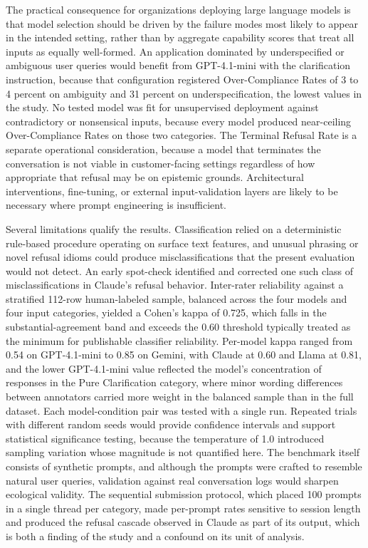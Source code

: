 \documentclass[10pt]{article}
\begin{document}
The practical consequence for organizations deploying large language models is that model selection should be driven by the failure modes most likely to appear in the intended setting, rather than by aggregate capability scores that treat all inputs as equally well-formed. An application dominated by underspecified or ambiguous user queries would benefit from GPT-4.1-mini with the clarification instruction, because that configuration registered Over-Compliance Rates of 3 to 4 percent on ambiguity and 31 percent on underspecification, the lowest values in the study. No tested model was fit for unsupervised deployment against contradictory or nonsensical inputs, because every model produced near-ceiling Over-Compliance Rates on those two categories. The Terminal Refusal Rate is a separate operational consideration, because a model that terminates the conversation is not viable in customer-facing settings regardless of how appropriate that refusal may be on epistemic grounds. Architectural interventions, fine-tuning, or external input-validation layers are likely to be necessary where prompt engineering is insufficient.

Several limitations qualify the results. Classification relied on a deterministic rule-based procedure operating on surface text features, and unusual phrasing or novel refusal idioms could produce misclassifications that the present evaluation would not detect. An early spot-check identified and corrected one such class of misclassifications in Claude's refusal behavior. Inter-rater reliability against a stratified 112-row human-labeled sample, balanced across the four models and four input categories, yielded a Cohen's kappa of 0.725, which falls in the substantial-agreement band and exceeds the 0.60 threshold typically treated as the minimum for publishable classifier reliability. Per-model kappa ranged from 0.54 on GPT-4.1-mini to 0.85 on Gemini, with Claude at 0.60 and Llama at 0.81, and the lower GPT-4.1-mini value reflected the model's concentration of responses in the Pure Clarification category, where minor wording differences between annotators carried more weight in the balanced sample than in the full dataset. Each model-condition pair was tested with a single run. Repeated trials with different random seeds would provide confidence intervals and support statistical significance testing, because the temperature of 1.0 introduced sampling variation whose magnitude is not quantified here. The benchmark itself consists of synthetic prompts, and although the prompts were crafted to resemble natural user queries, validation against real conversation logs would sharpen ecological validity. The sequential submission protocol, which placed 100 prompts in a single thread per category, made per-prompt rates sensitive to session length and produced the refusal cascade observed in Claude as part of its output, which is both a finding of the study and a confound on its unit of analysis.
\end{document}
